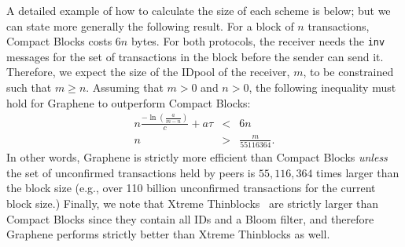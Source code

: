 A detailed example of how to calculate the size of each scheme is below; but we can state more generally the following result. For a
block of $n$ transactions, Compact Blocks costs $6n$ bytes. For both
protocols, the receiver needs the {\tt inv} messages for the set of
transactions in the block before the sender can send it. Therefore, we
expect the size of the IDpool of the receiver, $m$, to be constrained
such that $m \geq n$. Assuming that $m > 0$ and $n > 0$, the following
inequality must hold for Graphene to outperform Compact Blocks: 
\begin{eqnarray}
n\frac{-\ln(\frac{a}{m-n})}{c}+ a\tau &<& 6n\\
n&>& \frac{m}{55116364}.
\end{eqnarray}
In other words, Graphene is strictly more efficient than Compact Blocks {\em unless} the  set of unconfirmed transactions held by peers  is $55,116,364$ times larger than the block size (e.g.,  over 110 billion unconfirmed transactions for the current block size.)  Finally, we note that Xtreme Thinblocks~\cite{Tschipper:2016} are  strictly larger than Compact Blocks since they contain all IDs and a Bloom filter, and therefore Graphene performs strictly better than Xtreme Thinblocks as well. 

